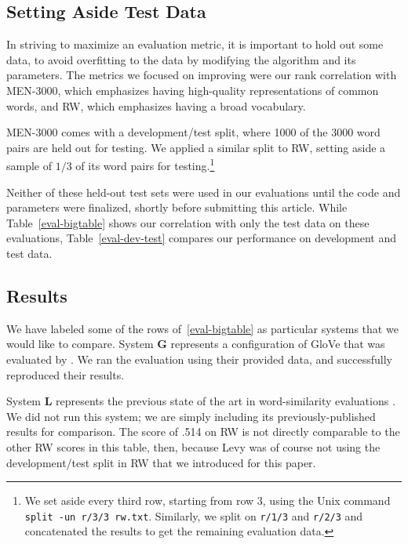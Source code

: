 \documentclass[letterpaper]{article}
\begin{document}
\subsection{Setting Aside Test Data}

In striving to maximize an evaluation metric, it is important to hold out some
data, to avoid overfitting to the data by modifying the algorithm and its
parameters. The metrics we focused on improving were our rank correlation with
MEN-3000, which emphasizes having high-quality representations of common words,
and RW, which emphasizes having a broad vocabulary.

MEN-3000 comes with a development/test split, where 1000 of the 3000 word pairs
are held out for testing. We applied a similar split to RW, setting aside a
sample of $1/3$ of its word pairs for testing.\footnote{
    We set aside every third row, starting from row 3, using the Unix command
    {\tt split -un r/3/3 rw.txt}. Similarly, we split on {\tt r/1/3} and
    {\tt r/2/3} and concatenated the results to get the remaining evaluation
    data.
}

Neither of these held-out test sets were used in our evaluations until the code
and parameters were finalized, shortly before submitting this article. While
Table~\ref{eval-bigtable} shows our correlation with only the test data on these
evaluations, Table~\ref{eval-dev-test} compares our performance on development
and test data.

\subsection{Results}

We have labeled some of the rows of~\ref{eval-bigtable} as particular systems
that we would like to compare. System {\bf G} represents a configuration of
GloVe that was evaluated by . We ran the evaluation
using their provided data, and successfully reproduced their results.

System {\bf L} represents the previous state of the
art in word-similarity evaluations \cite{levy2015embeddings}. We did not run this
system; we are simply including its previously-published results for comparison.
The score of .514 on RW is not directly comparable to the other RW scores in
this table, then, because Levy was of course not using the development/test
split in RW that we introduced for this paper.
\end{document}
